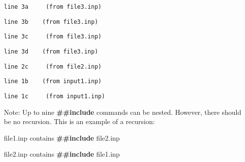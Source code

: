 \begin{lstlisting}
line 3a     (from file3.inp)
\end{lstlisting}

\begin{lstlisting}
line 3b    (from file3.inp)
\end{lstlisting}

\begin{lstlisting}
line 3c     (from file3.inp)
\end{lstlisting}

\begin{lstlisting}
line 3d    (from file3.inp)
\end{lstlisting}

\begin{lstlisting}
line 2c     (from file2.inp)
\end{lstlisting}

\begin{lstlisting}
line 1b    (from input1.inp)
\end{lstlisting}

\begin{lstlisting}
line 1c     (from input1.inp)
\end{lstlisting}

Note: Up to nine \textbf{\#\#include} commands can be nested. However, there should be no recursion. This is an example of a recursion:

file1.inp contains \textbf{\#\#include} file2.inp

file2.inp contains \textbf{\#\#include} file1.inp

